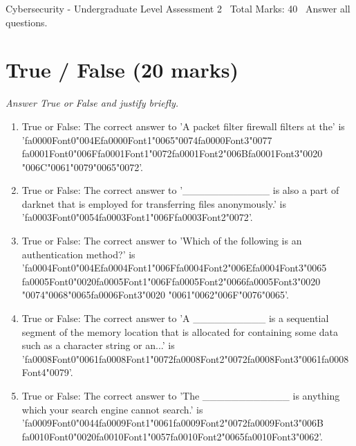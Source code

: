 \documentclass[12pt]{article}
\begin{document}
\begin{center}
Cybersecurity - Undergraduate Level Assessment 2 \
Total Marks: 40 \
Answer all questions.
\end{center}

\section*{True / False (20 marks)}
\textit{Answer True or False and justify briefly.}
\begin{enumerate}[label=\arabic*.]
\item True or False: The correct answer to 'A packet filter firewall filters at the' is '{\csname fa0000Font0\endcsname\char"004E}{\csname fa0000Font1\endcsname\char"0065}{\char"0074}{\csname fa0000Font3\endcsname\char"0077} {\csname fa0001Font0\endcsname\char"006F}{\csname fa0001Font1\endcsname\char"0072}{\csname fa0001Font2\endcsname\char"006B}{\csname fa0001Font3\endcsname\char"0020} {\char"006C}{\char"0061}{\char"0079}{\char"0065}{\char"0072}'.
\item True or False: The correct answer to '\_\_\_\_\_\_\_\_\_\_\_\_ is also a part of darknet that is employed for transferring files anonymously.' is '{\csname fa0003Font0\endcsname\char"0054}{\csname fa0003Font1\endcsname\char"006F}{\csname fa0003Font2\endcsname\char"0072}'.
\item True or False: The correct answer to 'Which of the following is an authentication method?' is '{\csname fa0004Font0\endcsname\char"004E}{\csname fa0004Font1\endcsname\char"006F}{\csname fa0004Font2\endcsname\char"006E}{\csname fa0004Font3\endcsname\char"0065} {\csname fa0005Font0\endcsname\char"0020}{\csname fa0005Font1\endcsname\char"006F}{\csname fa0005Font2\endcsname\char"0066}{\csname fa0005Font3\endcsname\char"0020} {\char"0074}{\char"0068}{\char"0065}{\csname fa0006Font3\endcsname\char"0020} {\char"0061}{\char"0062}{\char"006F}{\char"0076}{\char"0065}'.
\item True or False: The correct answer to 'A \_\_\_\_\_\_\_\_\_\_ is a sequential segment of the memory location that is allocated for containing some data such as a character string or an...' is '{\csname fa0008Font0\endcsname\char"0061}{\csname fa0008Font1\endcsname\char"0072}{\csname fa0008Font2\endcsname\char"0072}{\csname fa0008Font3\endcsname\char"0061}{\csname fa0008Font4\endcsname\char"0079}'.
\item True or False: The correct answer to 'The \_\_\_\_\_\_\_\_\_\_\_\_ is anything which your search engine cannot search.' is '{\csname fa0009Font0\endcsname\char"0044}{\csname fa0009Font1\endcsname\char"0061}{\csname fa0009Font2\endcsname\char"0072}{\csname fa0009Font3\endcsname\char"006B} {\csname fa0010Font0\endcsname\char"0020}{\csname fa0010Font1\endcsname\char"0057}{\csname fa0010Font2\endcsname\char"0065}{\csname fa0010Font3\endcsname\char"0062}'.

\end{enumerate}
\end{document}
